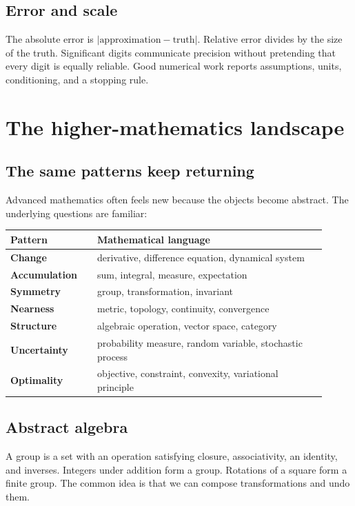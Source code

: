 \documentclass[11pt,oneside,openany]{book}
\newcommand{\abs}[1]{\left|#1\right|}
\begin{document}
\section{Error and scale}

The absolute error is $\abs{\text{approximation}-\text{truth}}$. Relative error divides by the size of the truth. Significant digits communicate precision without pretending that every digit is equally reliable. Good numerical work reports assumptions, units, conditioning, and a stopping rule.

\chapter{The higher-mathematics landscape}

\section{The same patterns keep returning}

Advanced mathematics often feels new because the objects become abstract. The underlying questions are familiar:

\begin{center}
\begin{tabular}{>{\bfseries}p{0.25\linewidth} p{0.66\linewidth}}
\toprule
Pattern & Mathematical language \\
\midrule
Change & derivative, difference equation, dynamical system \\
Accumulation & sum, integral, measure, expectation \\
Symmetry & group, transformation, invariant \\
Nearness & metric, topology, continuity, convergence \\
Structure & algebraic operation, vector space, category \\
Uncertainty & probability measure, random variable, stochastic process \\
Optimality & objective, constraint, convexity, variational principle \\
\bottomrule
\end{tabular}
\end{center}

\section{Abstract algebra}

A group is a set with an operation satisfying closure, associativity, an identity, and inverses. Integers under addition form a group. Rotations of a square form a finite group. The common idea is that we can compose transformations and undo them.
\end{document}
